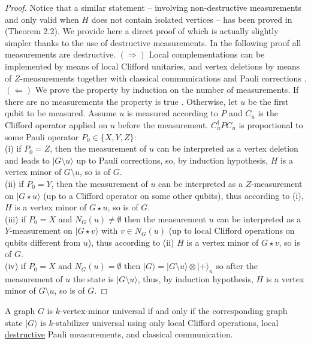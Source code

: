 \documentclass[a4paper,UKenglish,cleveref, autoref, thm-restate]{arxiv}
\newcommand{\ket}[1]{{\ensuremath{\lvert#1\rangle}}}
\begin{document}
\begin{proof} Notice that a similar statement -- involving non-destructive measurements and only valid when $H$ does not contain isolated vertices -- has been proved in \cite{DWH:transfo} (Theorem 2.2). We provide here a direct proof of  which is actually slightly simpler thanks to the use of destructive measurements. In the following proof all measurements are destructive. $(\Rightarrow)$ Local complementations can be implemented by means of local Clifford unitaries, and vertex deletions by means of $Z$-measurements together with classical communications and Pauli corrections \cite{VandenNest04}. $(\Leftarrow)$ We prove the property by induction on the number of measurements. If there are no measurements the property is true \cite{VandenNest04}. Otherwise, let $u$ be the first qubit to be measured. Assume $u$ is measured according to $P$ and $C_u$ is the Clifford operator applied on $u$ before the measurement. $C_u^\dagger P C_u$ is proportional to some Pauli operator $P_0\in \{X,Y,Z\}$: 
\\(i) if $P_0=Z$, then the measurement of $u$ can be interpreted as a vertex deletion and leads to $\ket{G\setminus u}$ up to Pauli corrections, so, by induction hypothesis, $H$ is a vertex minor of $G\setminus u$, so is of $G$. 
\\(ii) if $P_0=Y$, then the measurement of $u$ can be interpreted as a $Z$-measurement on $\ket{G\star u}$ (up to a Clifford operator on some other qubits), thus according to (i), $H$ is a vertex minor of $G\star u$, so is of $G$. 
\\(iii) if $P_0=X$ and $N_G(u)\neq \emptyset$ then  the measurement $u$ can be interpreted as a $Y$-measurement on $\ket{G\star v}$ with $v\in N_G(u)$ (up to local Clifford operations on qubits different from $u$), thus according to (ii) $H$ is a vertex minor of $G\star v$, so is of $G$. 
\\(iv) if $P_0=X$ and $N_G(u)=\emptyset$ then $\ket G = \ket {G\setminus u}\otimes \ket +_u$ so after the measurement of $u$ the state is $\ket {G\setminus u}$, thus, by induction hypothesis, $H$ is a vertex minor of $G\setminus u$, so is of $G$.  
\end{proof}

\begin{corollary}
    A graph $G$ is $k$-vertex-minor universal if and only if the corresponding graph state $\ket G$ is $k$-stabilizer universal using only local Clifford operations, local \underline{destructive} Pauli measurements, and classical communication.     
\end{corollary}
\end{document}
